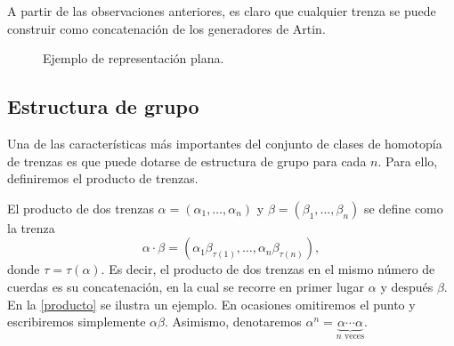 \documentclass[bibtex, anon]{TEMat-article}
\begin{document}
A partir de las observaciones anteriores, es claro que cualquier trenza se puede construir como concatenación de los generadores de Artin.

\begin{figure}[h!]
	\centering
	\caption{Ejemplo de representación plana.}\label{plana}
\end{figure}


\subsection{Estructura de grupo}
Una de las características más importantes del conjunto de clases de homotopía de trenzas es que puede dotarse de estructura de grupo para cada $n$. Para ello, definiremos el producto de trenzas. 

\begin{defi}
	El producto de dos trenzas $\alpha=(\alpha_1,\dots, \alpha_n)$ y $\beta=(\beta_1,\dots,\beta_n)$ se define como la trenza
	$$\alpha\cdot\beta = (\alpha_1\beta_{\tau(1)},\dots, \alpha_n\beta_{\tau(n)}),$$
	donde $\tau=\tau(\alpha)$. Es decir, el producto de dos trenzas en el mismo número de cuerdas es su concatenación, en la cual se recorre en primer lugar $\alpha$ y después $\beta$. En la \cref{producto} se ilustra un ejemplo. En ocasiones omitiremos el punto y escribiremos simplemente $\alpha\beta$. Asimismo, denotaremos $\alpha^n=\underbrace{\alpha\cdots\alpha}_{n\text{ veces}}$.
\end{defi}
\end{document}
